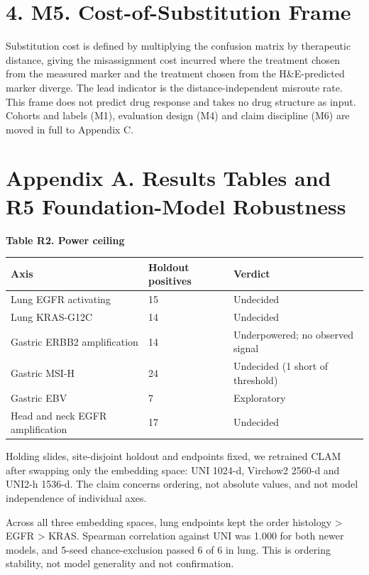 \section*{4. M5. Cost-of-Substitution Frame}

Substitution cost is defined by multiplying the confusion matrix by therapeutic distance, giving the misassignment cost incurred where the treatment chosen from the measured marker and the treatment chosen from the H\&E-predicted marker diverge. The lead indicator is the distance-independent misroute rate. This frame does not predict drug response and takes no drug structure as input. Cohorts and labels (M1), evaluation design (M4) and claim discipline (M6) are moved in full to Appendix C.

\section*{Appendix A. Results Tables and R5 Foundation-Model Robustness}

\textbf{Table R2. Power ceiling}

\begin{table}[ht]\centering\footnotesize
\begin{tabular}{lll}\hline
Axis & Holdout positives & Verdict \\\hline
Lung EGFR activating & 15 & Undecided \\
Lung KRAS-G12C & 14 & Undecided \\
Gastric ERBB2 amplification & 14 & Underpowered; no observed signal \\
Gastric MSI-H & 24 & Undecided (1 short of threshold) \\
Gastric EBV & 7 & Exploratory \\
Head and neck EGFR amplification & 17 & Undecided \\
\hline\end{tabular}\end{table}

Holding slides, site-disjoint holdout and endpoints fixed, we retrained CLAM after swapping only the embedding space: UNI 1024-d, Virchow2 2560-d and UNI2-h 1536-d. The claim concerns ordering, not absolute values, and not model independence of individual axes.

Across all three embedding spaces, lung endpoints kept the order histology > EGFR > KRAS. Spearman correlation against UNI was 1.000 for both newer models, and 5-seed chance-exclusion passed 6 of 6 in lung. This is ordering stability, not model generality and not confirmation.

